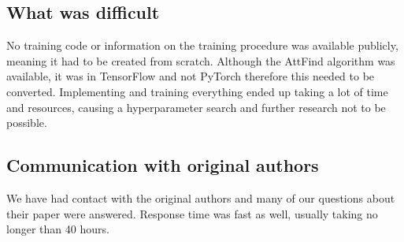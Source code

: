 \subsection*{What was difficult}
No training code or information on the training procedure was available publicly, meaning it had to be created from scratch. Although the AttFind algorithm was available, it was in TensorFlow and not PyTorch therefore this needed to be converted. Implementing and training everything ended up taking a lot of time and resources, causing a hyperparameter search and further research not to be possible.

\subsection*{Communication with original authors}
We have had contact with the original authors and many of our questions about their paper were answered. Response time was fast as well, usually taking no longer than 40 hours.







